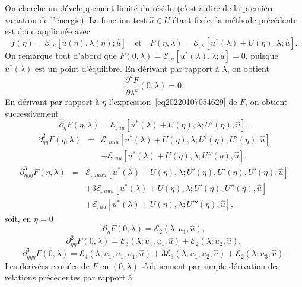 \documentclass{article}
\begin{document}
On cherche un développement limité du résidu (c'est-à-dire de
la première variation de l'énergie). La fonction test $\hat{u}∈U$
étant fixée, la méthode précédente est donc appliquée
avec
\begin{equation}
  \label{eq20220107054629} f (η) =ℰ_{, u} [u (η), λ
  (η) ; \hat{u}] \quad \text{et} \quad F (η, λ) =ℰ_{, u}
  [u^{\ast} (λ) + U (η), λ ; \hat{u}] .
\end{equation}
On remarque tout d'abord que $F (0, λ) =ℰ_{, u} [u^{\ast}
(λ), λ ; \hat{u}] = 0$, puisque $u^{\ast} (λ)$ est un point
d'équilibre. En dérivant par rapport à $λ$, on obtient
\begin{equation}
  \label{eq20211112164240} \frac{\partial^k F}{\partial λ^k} (0,
  λ) = 0.
\end{equation}
En dérivant par rapport à $η$ l'expression~\eqref{eq20220107054629}
de $F$, on obtient successivement
\begin{equation}
  \partial_{η} F (η, λ) =ℰ_{, u  u} [u^{\ast}
  (λ) + U (η), λ ; U' (η), \hat{u}],
\end{equation}
\begin{eqnarray}
  \partial_{η  η}^2 F (η, λ) & = & ℰ_{, u
   u  u} [u^{\ast} (λ) + U (η), λ ; U' (η),
  U' (η), \hat{u}] \nonumber\\
  &  &  +ℰ_{, u  u} [u^{\ast} (λ) + U
  (η), λ ; U'' (η), \hat{u}],
\end{eqnarray}
\begin{eqnarray}
  \partial_{η  η  η}^3 F (η, λ) & = &
  ℰ_{, u  u  u  u} [u^{\ast} (λ) + U
  (η), λ ; U' (η), U' (η), U' (η), \hat{u}] \nonumber\\
  &  &  + 3ℰ_{, u  u  u} [u^{\ast}
  (λ) + U (η), λ ; U' (η), U'' (η), \hat{u}] \nonumber\\
  &  &  +ℰ_{, u  u} [u^{\ast} (λ) + U
  (η), λ ; U''' (η), \hat{u}],
\end{eqnarray}
soit, en $η = 0$
\begin{equation}
  \partial_{η} F (0, λ) =ℰ_2 (λ ; u_1, \hat{u}),
\end{equation}
\begin{equation}
  \partial_{η  η}^2 F (0, λ) =ℰ_3 (λ ;
  u_1, u_1, \hat{u}) +ℰ_2 (λ ; u_2, \hat{u}),
\end{equation}
\begin{equation}
  \partial_{η  η  η}^3 F (0, λ) =ℰ_4
  (λ ; u_1, u_1, u_1, \hat{u}) + 3ℰ_3 (λ ; u_1, u_2,
  \hat{u}) +ℰ_2 (λ ; u_3, \hat{u}) .
\end{equation}
Les dérivées croisées de $F$ en $(0, λ)$ s'obtiennent par
simple dérivation des relations précédentes par rapport à
\end{document}
